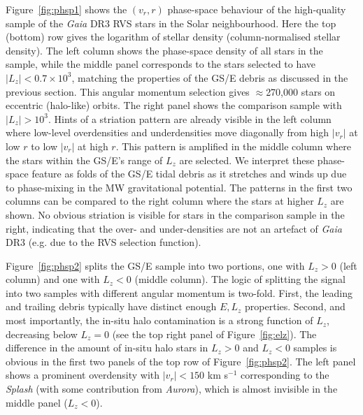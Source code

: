\documentclass[a4paper,useAMS,usenatbib]{mnras}
\begin{document}
Figure~\ref{fig:phsp1} shows the $(v_r, r)$ phase-space behaviour of the high-quality sample of the {\it Gaia} DR3 RVS stars in the Solar neighbourhood. Here the top (bottom) row gives the logarithm of stellar density (column-normalised stellar density). The left column shows the phase-space density of all stars in the sample, while the middle panel corresponds to the stars selected to have $|L_z|<0.7\times10^{3}$, matching the properties of the GS/E debris as discussed in the previous section. This angular momentum selection gives $\approx$270,000 stars on eccentric (halo-like) orbits. The right panel shows the comparison sample with $|L_z|>10^{3}$. Hints of a striation pattern are already visible in the left column where low-level overdensities and underdensities move diagonally from high $|v_r|$ at low $r$ to low $|v_r|$ at high $r$. This pattern is amplified in the middle column where the stars within the GS/E's range of $L_z$ are selected. We interpret these phase-space feature as folds of the GS/E tidal debris as it stretches and winds up due to phase-mixing in the MW gravitational potential. The patterns in the first two columns can be compared to the right column where the stars at higher $L_z$ are shown. No obvious striation is visible for stars in the comparison sample in the right, indicating that the over- and under-densities are not an artefact of {\it Gaia} DR3 (e.g. due to the RVS selection function).

Figure~\ref{fig:phsp2} splits the GS/E sample into two portions, one with $L_z>0$ (left column) and one with $L_z<0$ (middle column). The logic of splitting the signal into two samples with different angular momentum is two-fold. First, the leading and trailing debris typically have distinct enough $E,L_z$ properties. Second, and most importantly, the in-situ halo contamination is a strong function of $L_z$, decreasing below $L_z=0$ (see the top right panel of Figure~\ref{fig:elz}). The difference in the amount of in-situ halo stars in $L_z>0$ and $L_z<0$ samples is obvious in the first two panels of the top row of Figure~\ref{fig:phsp2}. The left panel shows a prominent overdensity with $|v_r|<150$ km s$^{-1}$ corresponding to the {\it Splash} (with some contribution from {\it Aurora}), which is almost invisible in the middle panel ($L_z<0$).
\end{document}
